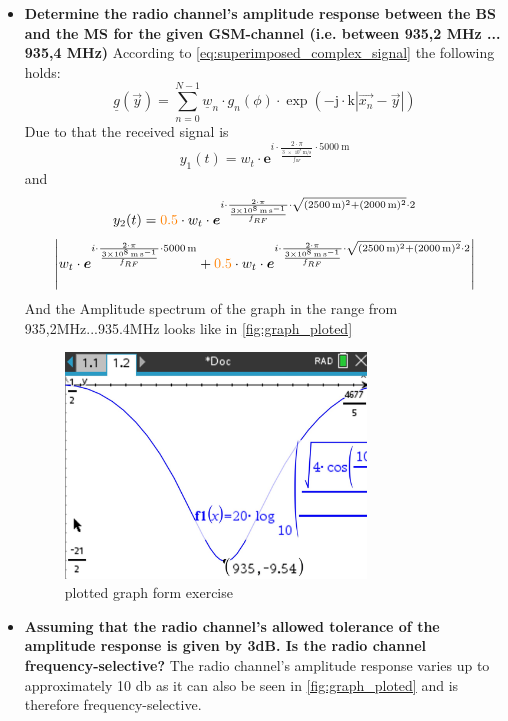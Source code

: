 \begin{itemize}
    \item \textbf{Determine the radio channel's amplitude response between the BS and the MS for the given GSM-channel (i.e. between 935,2 MHz ... 935,4 MHz)}\newline
    According to \autoref{eq:superimposed_complex_signal} the following holds:
    $$
    \underline{g}(\vec{y})=\sum_{n=0}^{N-1} \underline{w}_n \cdot g_n(\phi) \cdot \exp \left(-\mathrm{j} \cdot \mathrm{k}\left|\overrightarrow{x_n}-\vec{y}\right|\right)
    $$
    Due to that the received signal is
    $$y_1(t)=w_t \cdot \boldsymbol{e}^{i\cdot \frac{2 \cdot \pi}{\frac{\SI{3e8}{\meter\per\second}}{f_{RF}}}\cdot \SI{5000}{\meter}}$$ and $$y_2(t)=\textcolor{orange}{0.5} \cdot w_t \cdot \boldsymbol{e}^{i\cdot \frac{2 \cdot \pi}{\frac{\SI{3e8}{\meter\per\second}}{f_{RF}}}\cdot \sqrt{(\SI{2500}{\meter})^2+(\SI{2000}{\meter})^2}\cdot2}$$ 
    $$
    \left| w_t \cdot \boldsymbol{e}^{i\cdot \frac{2 \cdot \pi}{\frac{\SI{3e8}{\meter\per\second}}{f_{RF}}}\cdot \SI{5000}{\meter}}  +\textcolor{orange}{0.5} \cdot w_t \cdot \boldsymbol{e}^{i\cdot \frac{2 \cdot \pi}{\frac{\SI{3e8}{\meter\per\second}}{f_{RF}}}\cdot \sqrt{(\SI{2500}{\meter})^2+(\SI{2000}{\meter})^2}\cdot2}  \right|
    $$
    And the Amplitude spectrum of the graph in the range from 935,2MHz...935.4MHz looks like in \autoref{fig:graph_ploted}
    \begin{figure}[ht]
      \centering
      \includegraphics[width=8cm]{images/graph.jpg}
      \caption{plotted graph form exercise}
      \label{fig:graph_ploted}
    \end{figure}
    \item \textbf{Assuming that the radio channel's allowed tolerance of the amplitude response is given by 3dB. Is the radio channel frequency-selective?}\newline
    The radio channel's amplitude response varies up to approximately 10 db as it can also be seen in \autoref{fig:graph_ploted} and is therefore frequency-selective.

\end{itemize}
